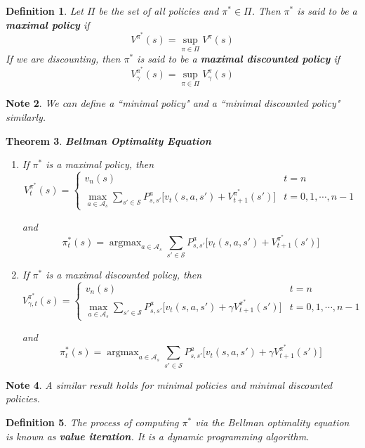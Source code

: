 \documentclass[12pt]{amsart}
\newtheorem{thm}{Theorem}[section]
\newtheorem{defn}[thm]{Definition}
\newtheorem{note}[thm]{Note}
\newcommand{\gam}{\gamma}
\newcommand{\MA}{\mathcal{A}}
\newcommand{\MS}{\mathcal{S}}
\DeclareMathOperator*{\argmax}{argmax}
\begin{document}
\begin{defn}
Let $\Pi$ be the set of all policies and $\pi^* \in \Pi$. Then $\pi^*$ is said to be a \textbf{maximal policy} if$$V^{\pi^*}(s) = \sup_{\pi \in \Pi}V^{\pi}(s)$$ If we are discounting, then $\pi^*$ is said to be a \textbf{maximal discounted policy} if $$V_{\gam}^{\pi^*}(s) = \sup_{\pi \in \Pi}V_{\gam}^{\pi}(s)$$ 
\end{defn}

\begin{note}
We can define a ``minimal policy" and a ``minimal discounted policy" similarly.
\end{note}
\newpage

\begin{thm}{\textbf{Bellman Optimality Equation}} 
\begin{enumerate}
\item If $\pi^*$ is a maximal policy, then 
\[ V_t^{\pi^*}(s) =
\begin{cases}
 v_n(s) & t = n \\
 \max\limits_{a \in \MA_s} \sum\limits_{s' \in \MS}P^{a}_{s, s'} \bigg[v_t(s,a, s') + V_{t+1}^{\pi^*}(s')\bigg] & t= 0, 1, \cdots, n-1
\end{cases}
\]

and $$\pi^*_t(s) = \argmax_{a \in \MA_s} \sum\limits_{s' \in \MS}P^{a}_{s, s'} \bigg[v_t(s, a, s') +  V_{t+1}^{\pi^*}(s')\bigg]$$ 

\item If $\pi^*$ is a maximal discounted policy, then 
\[ V_{\gam, t}^{\pi^*}(s) =
\begin{cases}
 v_n(s) & t = n \\
 \max\limits_{a \in \MA_s} \sum\limits_{s' \in \MS}P^{a}_{s, s'} \bigg[v_t(s,a, s') + \gam V_{t+1}^{\pi^*}(s')\bigg] & t= 0, 1, \cdots, n-1
\end{cases}
\]

and $$\pi^*_t(s) = \argmax_{a \in \MA_s} \sum\limits_{s' \in \MS}P^{a}_{s, s'} \bigg[v_t(s, a, s') +  \gam V_{t+1}^{\pi^*}(s')\bigg]$$ 
\end{enumerate}
\end{thm}

\begin{note}
A similar result holds for minimal policies and minimal discounted policies.
\end{note}

\begin{defn}
The process of computing $\pi^*$ via the Bellman optimality equation is known as \textbf{value iteration}. It is a dynamic programming algorithm. 
\end{defn}
\end{document}
